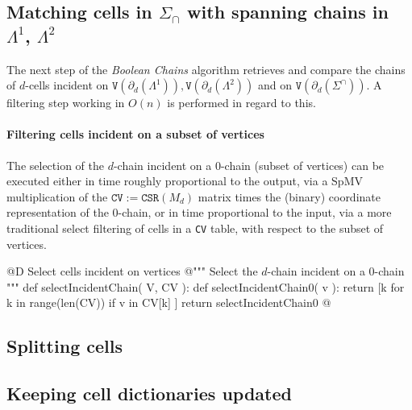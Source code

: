 \documentclass[11pt,oneside]{article}	%
\begin{document}
\subsection{Matching cells in $\Sigma_\cap$ with spanning chains in $\Lambda^1$, $\Lambda^2$}

The next step of the \emph{Boolean Chains} algorithm retrieves and compare the chains of $d$-cells incident on $\texttt{V}(\partial_d(\Lambda^1)), \texttt{V}(\partial_d(\Lambda^2))$ and on $\texttt{V}(\partial_d(\Sigma^\cap))$. A filtering step working in $O(n)$ is performed in regard to this.

\paragraph{Filtering cells incident on a subset of vertices}

The selection of the $d$-chain incident on a $0$-chain (subset of vertices) can be executed either in time roughly proportional to the output, via a SpMV multiplication of the $\texttt{CV} := \texttt{CSR}(M_d)$ matrix times the (binary) coordinate representation of the $0$-chain, or in time proportional to the input, via a more traditional select filtering of cells in a \texttt{CV} table, with respect to the subset of vertices.


@D Select cells incident on vertices
@{""" Select the $d$-chain incident on a $0$-chain """
def selectIncidentChain( V, CV ):
	def selectIncidentChain0( v ):
		return [k for k in range(len(CV)) if v in CV[k] ]
	return selectIncidentChain0
@}


\subsection{Splitting cells}
\subsection{Keeping cell dictionaries updated}
\end{document}
